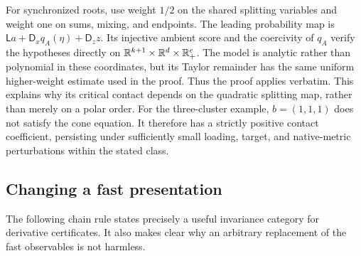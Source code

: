 For synchronized roots, use weight $1/2$ on the shared splitting variables and weight one on sums, mixing, and endpoints. The leading probability map is $\mathsf La+\mathsf D_xq_A(\eta)+\mathsf D_z z$. Its injective ambient score and the coercivity of $q_A$ verify the hypotheses directly on $\mathbb R^{k+1}\times\mathbb R^d\times\mathbb R_+^e$. The model is analytic rather than polynomial in these coordinates, but its Taylor remainder has the same uniform higher-weight estimate used in the proof. Thus the proof applies verbatim. This explains why its critical contact depends on the quadratic splitting map, rather than merely on a polar order. For the three-cluster example, $b=(1,1,1)$ does not satisfy the cone equation. It therefore has a strictly positive contact coefficient, persisting under sufficiently small loading, target, and native-metric perturbations within the stated class.

\subsection{Changing a fast presentation}
The following chain rule states precisely a useful invariance category for derivative certificates. It also makes clear why an arbitrary replacement of the fast observables is not harmless.

